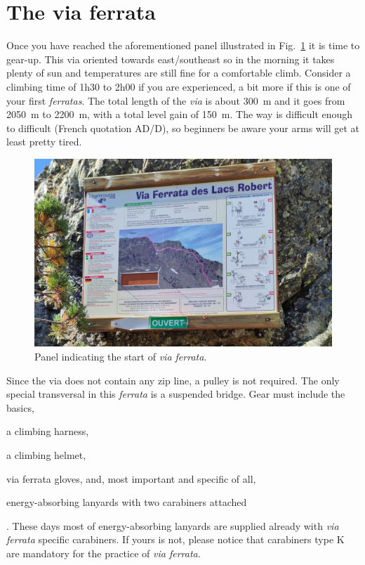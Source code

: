 \section*{The via ferrata}

Once you have reached the aforementioned panel illustrated in Fig.~\ref{fig:via-ferrata-des-lacs-robert-3} it is time to gear-up. This via oriented towards east/southeast so in the morning it takes plenty of sun and temperatures are still fine for a comfortable climb. Consider a climbing time of 1h30 to 2h00 if you are experienced, a bit more if this is one of your first \emph{ferratas}. The total length of the \emph{via} is about 300~m and it goes from 2050~m to 2200~m, with a total level gain of 150~m. The way is difficult enough to difficult (French quotation AD/D), so beginners be aware your arms will get at least pretty tired.

\begin{figure}[!ht]
\centering%
\includegraphics[width=\columnwidth, clip]{media/pictures/via-ferrata-des-lacs-robert-3}
\caption{\label{fig:via-ferrata-des-lacs-robert-3}Panel indicating the start of \emph{via ferrata}.}
\end{figure}

Since the via does not contain any zip line, a pulley is not required. The only special transversal in this \emph{ferrata} is a suspended bridge. Gear must include the basics, \begin{inparaenum}[(i)] \item a climbing harness, \item a climbing helmet, \item via ferrata gloves, and, most important and specific of all, \item energy-absorbing lanyards with two carabiners attached\end{inparaenum}. These days most of energy-absorbing lanyards are supplied already with \emph{via ferrata} specific carabiners. If yours is not, please notice that carabiners type K are mandatory for the practice of \emph{via ferrata}.

